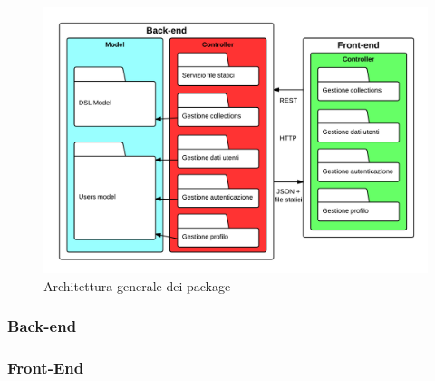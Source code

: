 \begin{figure}[H] %
\centering
\includegraphics[width=\textwidth]{uml/architettura-generale-package.png}
\caption{Architettura generale dei package}
\label{architetturaGeneralePackage}
\end{figure}

\subsubsection{Back-end}
\subsubsection{Front-End}